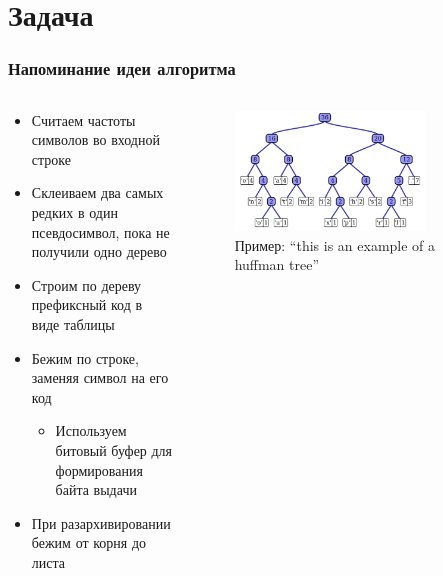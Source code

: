 \documentclass{../../slides-style}
\begin{document}
    \section{Задача}

    \begin{frame}
        \frametitle{Напоминание идеи алгоритма}
        \begin{columns}
            \begin{column}{0.5\textwidth}
                \begin{itemize}
                    \item Считаем частоты символов во входной строке
                    \item Склеиваем два самых редких в один псевдосимвол, пока не получили одно дерево
                    \item Строим по дереву префиксный код в виде таблицы
                    \item Бежим по строке, заменяя символ на его код
                    \begin{itemize}
                        \item Используем битовый буфер для формирования байта выдачи
                    \end{itemize}
                    \item При разархивировании бежим от корня до листа
                \end{itemize}
            \end{column}
            \begin{column}{0.5\textwidth}
                \begin{figure}[htp]
                    \centering
                    \includegraphics[width=0.8\textwidth]{huffman-tree.png}
                    Пример: ``this is an example of a huffman tree''
                \end{figure}
            \end{column}
        \end{columns}
    \end{frame}
\end{document}
